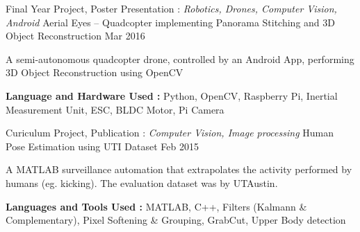 

\begin{cventries}
  \cventry
    {Final Year Project, Poster Presentation : \textit{Robotics, Drones, Computer Vision, Android}} %
    {Aerial Eyes – Quadcopter implementing Panorama Stitching and 3D Object Reconstruction} %
    {} %
    {Mar 2016} %
    {
      \begin{cvitems}
      \item{A semi-autonomous quadcopter drone, controlled by an Android App, performing 3D Object Reconstruction using OpenCV}
      \item{\textbf{Language and Hardware Used :} Python, OpenCV, Raspberry Pi, Inertial Measurement Unit, ESC, BLDC Motor, Pi Camera}
      \end{cvitems}
    }

  \cventry
    {Curiculum Project, Publication : \textit{Computer Vision, Image processing}} %
    {Human Pose Estimation using UTI Dataset} %
    {} %
    {Feb 2015} %
    {
      \begin{cvitems}
      \item{A MATLAB surveillance automation that extrapolates the activity performed by humans (eg. kicking). The evaluation dataset was by UTAustin.}
      \item{\textbf{Languages and Tools Used :} MATLAB, C++, Filters (Kalmann \& Complementary), Pixel Softening \& Grouping, GrabCut, Upper Body detection}
      \end{cvitems}
    }


\end{cventries}
